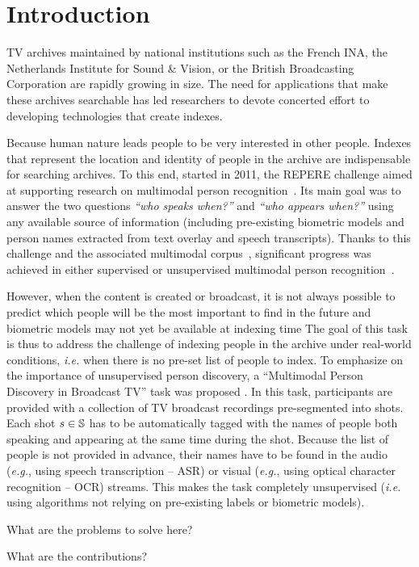 \section{Introduction}

TV archives maintained by national institutions such as the French INA, the Netherlands Institute for Sound \& Vision, or the British Broadcasting Corporation are rapidly growing in size. The need for applications that make these archives searchable has led researchers to devote concerted effort to developing technologies that create indexes.

Because human nature leads people to be very interested in other people.
Indexes that represent the location and identity of people in the archive are indispensable for searching archives.
%
To this end, started in 2011, the REPERE challenge aimed at supporting research on multimodal person recognition~\cite{BERNARD--SLAM--2013, KAHN--CBMI--2012}. Its main goal was to answer the two questions \emph{``who speaks when?''} and \emph{``who appears when?''} using any available source of information (including pre-existing biometric models and person names extracted from text overlay and speech transcripts). 
%
Thanks to this challenge and the associated multimodal corpus~\cite{GIRAUDEL--LREC--2012}, significant progress was achieved in either supervised or unsupervised multimodal person recognition~\cite{BECHET--INTERSPEECH--2014, BENDRIS--CBMI--2013, BREDIN--ODYSSEY--2014, BREDIN--INTERSPEECH--2013, BREDIN--SLAM--2013, BREDIN--IJMIR--2014, FAVRE--SLAM--2013, GAY--CBMI--2014, POIGNANT--ASLP--2015, POIGNANT--SLAM--2013, POIGNANT--INTERSPEECH--2012, POIGNANT--MTAP--2015, ROUVIER--CBMI--2014}.

However, when the content is created or broadcast, it is not always possible to predict which people will be the most important to find in the future and biometric models may not yet be available at indexing time The goal of this task is thus to address the challenge of indexing people in the archive under real-world conditions, \emph{i.e.} when there is no pre-set list of people to index.
%
To emphasize on the importance of unsupervised person discovery, a ``Multimodal Person Discovery in Broadcast TV'' task was proposed \cite{POIGNANT--MEDIAEVAL--2015,tocite}. In this task, participants are provided with a collection of TV broadcast recordings pre-segmented into shots. Each shot $s \in \mathbb{S}$ has to be automatically tagged with the names of people both speaking and appearing at the same time during the shot.
%
Because the list of people is not provided in advance, their names have to be found in the audio (\emph{e.g.}, using speech transcription -- ASR) or visual (\emph{e.g.}, using optical character recognition -- OCR) streams.
%
This makes the task completely unsupervised (\emph{i.e.} using algorithms not relying on pre-existing labels or biometric models).

What are the problems to solve here?

What are the contributions?

\endinput
